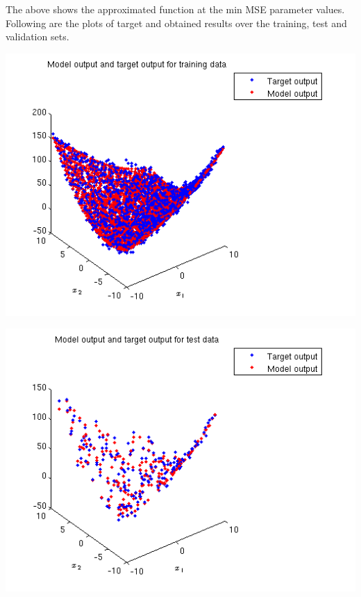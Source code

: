 \documentclass{article}
\begin{document}
The above shows the approximated function at the min MSE parameter values.
\\[10pt]
Following are the plots of target and obtained results over the training, test and validation sets.
\begin{center}
\includegraphics[scale=.6]{Regression/bivar/nu/plot_train}
\end{center}
\begin{center}
\includegraphics[scale=.6]{Regression/bivar/nu/plot_test}
\end{center}
\end{document}
